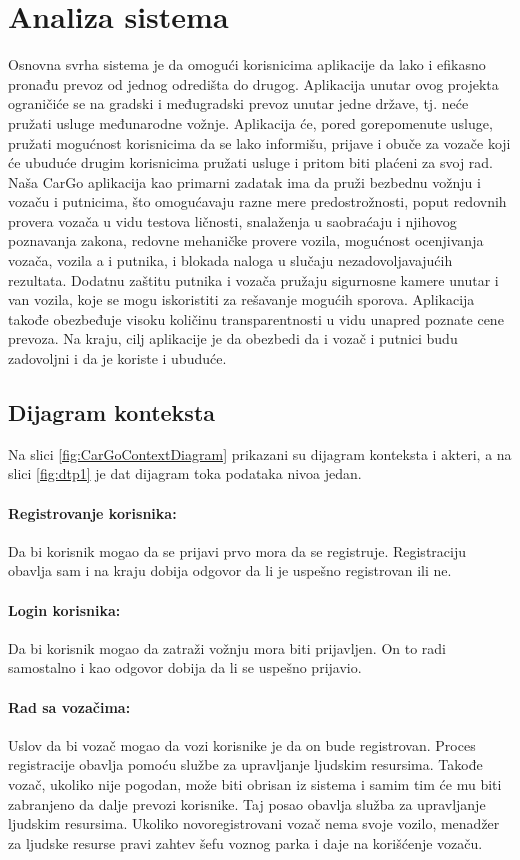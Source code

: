 \section{\bfseries Analiza sistema}

Osnovna svrha sistema je da omogući korisnicima aplikacije da lako i efikasno pronađu prevoz od jednog odredišta do drugog. Aplikacija unutar ovog projekta ograničiće se na gradski i međugradski prevoz unutar jedne države, tj. neće pružati usluge međunarodne vožnje. Aplikacija će, pored gorepomenute usluge, pružati mogućnost korisnicima da se lako informišu, prijave i obuče za vozače koji će ubuduće drugim korisnicima pružati usluge i pritom biti plaćeni za svoj rad. Naša CarGo aplikacija kao primarni zadatak ima da pruži bezbednu vožnju i vozaču i putnicima, što omogućavaju razne mere predostrožnosti, poput redovnih provera vozača u vidu testova ličnosti, snalaženja u saobraćaju i njihovog poznavanja zakona, redovne mehaničke provere vozila, mogućnost ocenjivanja vozača, vozila a i putnika, i blokada naloga u slučaju nezadovoljavajućih rezultata. Dodatnu zaštitu putnika i vozača pružaju sigurnosne kamere unutar i van vozila, koje se mogu iskoristiti za rešavanje mogućih sporova. Aplikacija takođe obezbeđuje visoku količinu transparentnosti u vidu unapred poznate cene prevoza. Na kraju, cilj aplikacije je da obezbedi da i vozač i putnici budu zadovoljni i da je koriste i ubuduće.
     
\subsection{\bfseries Dijagram konteksta}

\quad Na slici \ref{fig:CarGoContextDiagram} prikazani su dijagram konteksta i akteri, a na slici \ref{fig:dtp1} je dat dijagram toka podataka nivoa jedan.
\paragraph{Registrovanje korisnika:}
    Da bi korisnik mogao da se prijavi prvo mora da se registruje. Registraciju obavlja sam i na kraju dobija odgovor da li je uspešno registrovan ili ne.
\paragraph{Login korisnika:}
    Da bi korisnik mogao da zatraži vožnju mora biti prijavljen. On to radi samostalno i kao odgovor dobija da li se uspešno prijavio.
\paragraph{Rad sa voza\v cima:}
    Uslov da bi vozač mogao da vozi korisnike je da on bude registrovan. Proces registracije obavlja pomoću službe za upravljanje ljudskim resursima. Takođe vozač, ukoliko nije pogodan, mo\v ze biti obrisan iz sistema i samim tim će mu biti zabranjeno da dalje prevozi korisnike. Taj posao obavlja služba za upravljanje ljudskim resursima. Ukoliko novoregistrovani vozač nema svoje vozilo, menadžer za ljudske resurse pravi zahtev šefu voznog parka i daje na kori\v sćenje voza\v cu.

